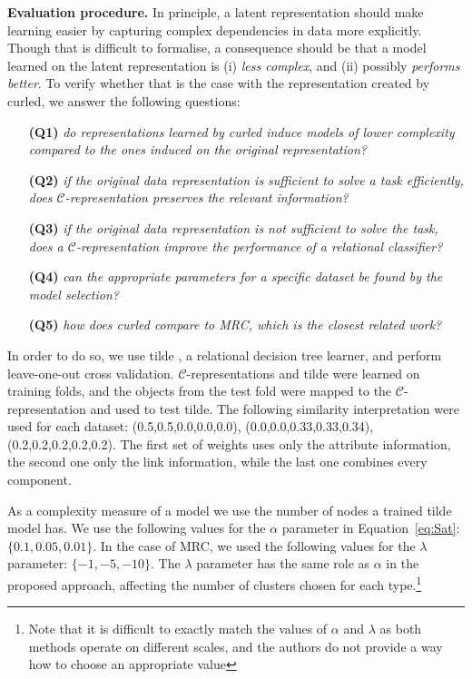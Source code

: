 \textbf{Evaluation procedure.}
In principle, a latent representation should make learning easier by capturing complex dependencies in data more explicitly.
Though that is difficult to formalise, a consequence should be that a model learned on the latent representation is (i) \textit{less complex}, and (ii) possibly \textit{performs better}.
To verify whether that is the case with the representation created by \gls{curled}, we answer the following questions:
\begin{itemize}
	\setlength\itemsep{0.06em}
    \item[\textbf{(Q1)}] \textit{do representations learned by \gls{curled} induce models of lower complexity compared to the ones induced on the original representation?}
    \item[\textbf{(Q2)}] \textit{if the original data representation is sufficient to solve a task efficiently, does $\mathcal{C}$-representation preserves the relevant information?}
    \item[\textbf{(Q3)}] \textit{if the original data representation is not sufficient to solve the task, does a $\mathcal{C}$-representation improve the performance of a relational classifier?}
    \item[\textbf{(Q4)}] \textit{can the appropriate parameters for a specific dataset be found by the model selection?}
    \item[\textbf{(Q5)}] \textit{how does \gls{curled} compare to MRC, which is the closest related work?}
\end{itemize}


In order to do so, we use \gls{tilde} \cite{Blockeel1998285}, a relational decision tree learner, and perform leave-one-out cross validation.
$\mathcal{C}$-representations and \gls{tilde} were learned on training folds, and the objects from the test fold were mapped to the $\mathcal{C}$-representation and used to test \gls{tilde}.
The following similarity interpretation were used for each dataset: (0.5,0.5,0.0,0.0,0.0), (0.0,0.0,0.33,0.33,0.34), (0.2,0.2,0.2,0.2,0.2).
The first set of weights uses only the attribute information, the second one only the link information, while the last one combines every component.



As a complexity measure of a model we use the number of nodes a trained \gls{tilde} model has.
We use the following values for the $\alpha$ parameter in Equation~\ref{eq:Sat}: $\{ 0.1,0.05, 0.01 \}$.
In the case of MRC, we used the following values for the $\lambda$ parameter: $\{-1,-5,-10\}$.
The $\lambda$ parameter has the same role as $\alpha$ in the proposed approach, affecting the number of clusters chosen for each type.\footnote{Note that it is difficult to exactly match the values of $\alpha$ and $\lambda$ as both methods operate on different scales, and the authors do not provide a way how to choose an appropriate value}




